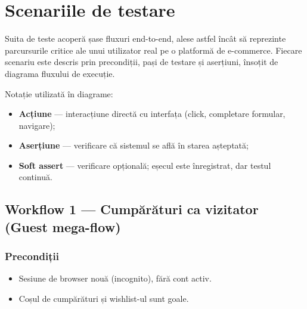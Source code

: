 \chapter{Scenariile de testare}

Suita de teste acoperă șase fluxuri end-to-end, alese astfel încât să reprezinte parcursurile
critice ale unui utilizator real pe o platformă de e-commerce. Fiecare scenariu este descris
prin precondiții, pași de testare și aserțiuni, însoțit de diagrama fluxului de execuție.

Notație utilizată în diagrame:
\begin{itemize}
    \item \textbf{Acțiune} --- interacțiune directă cu interfața (click, completare formular, navigare);
    \item \textbf{Aserțiune} --- verificare că sistemul se află în starea așteptată;
    \item \textbf{Soft assert} --- verificare opțională; eșecul este înregistrat, dar testul continuă.
\end{itemize}

\section{Workflow 1 --- Cumpărături ca vizitator (Guest mega-flow)}

\subsection*{Precondiții}
\begin{itemize}
    \item Sesiune de browser nouă (incognito), fără cont activ.
    \item Coșul de cumpărături și wishlist-ul sunt goale.
\end{itemize}

